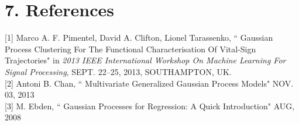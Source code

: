 \documentclass[letterpaper]{article}
\begin{document}
\section{7.  References}

[1] Marco A. F. Pimentel, David A. Clifton, Lionel Tarassenko, `` Gaussian Process Clustering For The Functional Characterisation Of Vital-Sign Trajectories"
 in {\it 2013 IEEE International Workshop On Machine Learning For Signal Processing}, SEPT. 22–25, 2013, SOUTHAMPTON, UK. \\

[2] Antoni B. Chan, ``{ Multivariate Generalized Gaussian Process Models}" NOV. 03, 2013 \\

[3] M. Ebden, ``{ Gaussian Processes for Regression: A Quick Introduction}" AUG, 2008 \\
\end{document}
